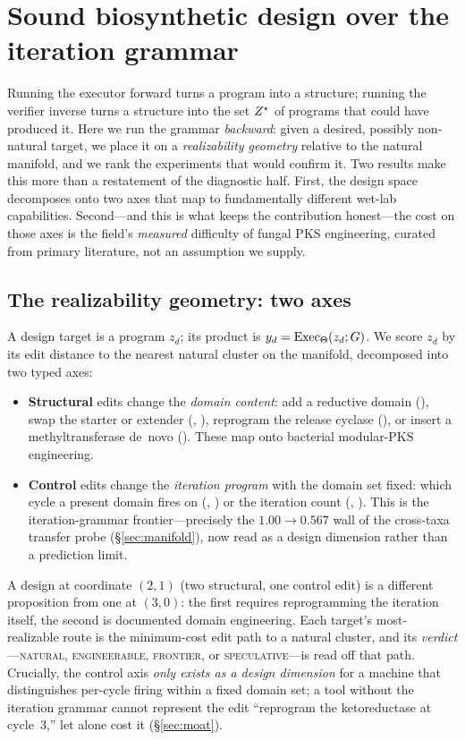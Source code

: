\section{Sound biosynthetic design over the iteration grammar}\label{sec:design}

Running the executor forward turns a program into a structure; running the verifier inverse turns a
structure into the set $Z^{\star}$ of programs that could have produced it. Here we run the grammar
\emph{backward}: given a desired, possibly non-natural target, we place it on a \emph{realizability
geometry} relative to the natural manifold, and we rank the experiments that would confirm it. Two
results make this more than a restatement of the diagnostic half. First, the design space decomposes
onto two axes that map to fundamentally different wet-lab capabilities. Second---and this is what keeps
the contribution honest---the cost on those axes is the field's \emph{measured} difficulty of fungal PKS
engineering, curated from primary literature, not an assumption we supply.

\subsection{The realizability geometry: two axes}\label{sec:realiz-geometry}
A design target is a program $z_d$; its product is $y_d=\mathrm{Exec}_\Theta(z_d;G)$. We score $z_d$ by its
edit distance to the nearest natural cluster on the manifold, decomposed into two typed axes:
\begin{itemize}[leftmargin=1.4em,itemsep=2pt]
  \item \textbf{Structural} edits change the \emph{domain content}: add a reductive domain
  (), swap the starter or extender (, ), reprogram the
  release cyclase (), or insert a methyltransferase de~novo (). These map
  onto bacterial modular-PKS engineering.
  \item \textbf{Control} edits change the \emph{iteration program} with the domain set fixed: which cycle
  a present domain fires on (, ) or the iteration count
  (, ). This is the iteration-grammar frontier---precisely the
  $1.00\!\to\!0.567$ wall of the cross-taxa transfer probe (\S\ref{sec:manifold}), now read as a design
  dimension rather than a prediction limit.
\end{itemize}
A design at coordinate $(2,1)$ (two structural, one control edit) is a different proposition from one at
$(3,0)$: the first requires reprogramming the iteration itself, the second is documented domain
engineering. Each target's most-realizable route is the minimum-cost edit path to a natural cluster, and
its \emph{verdict}---\textsc{natural}, \textsc{engineerable}, \textsc{frontier}, or
\textsc{speculative}---is read off that path. Crucially, the control axis \emph{only exists as a design
dimension} for a machine that distinguishes per-cycle firing within a fixed domain set; a tool without
the iteration grammar cannot represent the edit ``reprogram the ketoreductase at cycle~3,'' let alone
cost it (\S\ref{sec:moat}).

